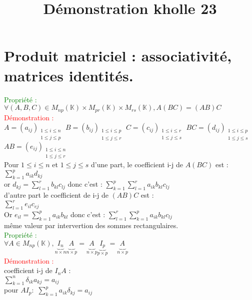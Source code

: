 \documentclass{article}
\begin{document}
\title{Démonstration kholle 23}
\date{}
\maketitle
	\renewcommand{\thesection}{\Roman{section}}
	\setlength{\parindent}{1.5cm}
	\section{ Produit matriciel : associativité, matrices identités.}
	\textcolor{green}{Propriété :}
	$\forall (A,B,C) \in M_{np}(\mathbb K) \times M_{pr}(\mathbb K) \times M_{rs}(\mathbb K), A(BC)=(AB)C$ \\
	\textcolor{red}{Démonstration :} \\
	$A=(a_{ij}){}_{\substack{1\leq i\leq n \\ 1\leq j\leq p}}$
	$B=(b_{ij}){}_{\substack{1\leq i\leq p \\ 1\leq j\leq r}}$
	 $C=(c_{ij}){}_{\substack{1\leq i\leq r \\ 1\leq j\leq s}}$
	 $BC=(d_{ij}){}_{\substack{1\leq i\leq p \\ 1\leq j\leq s}}$
	 $AB=(e_{ij}){}_{\substack{1\leq i\leq n \\ 1\leq j\leq r}}$ \\
	 Pour $1 \leq i \leq n$ et $1 \leq j \leq s$ d'une part, le coefficient i-j de $A(BC)$ est :\\
	  $\sum_{k=1}^p a_{ik}d_{kj}$ \\
	 or $d_{kj}= \sum_{l=1}^r b_{kl} c_{lj}$ donc c'est : $\sum_{k=1}^p \sum_{l=1}^r a_{ik}b_{kl}c_{lj}$ \\
	 d'autre part le coefficient de i-j de $(AB)C$ est : \\
	 $\sum_{l=1}^r e_{il}c_{ej}$ \\
	 Or $e_{il}= \sum_{k=1}^p a_{ik} b_{kl}$ donc c'est : $\sum_{l=1}^r \sum_{k=1}^p a_{ik} b_{kl} c_{lj}$ \\
	 même valeur par intervertion des sommes rectangulaires. \\
	 \textcolor{green}{Propriété :} \\
	 $\forall A \in M_{np}(\mathbb K), \underbrace{I_n}_{n \times n} \underbrace{A_{}}_{n \times p} = \underbrace{A_{}}_{n \times p} \underbrace{I_p}_{p \times p} = \underbrace{A_{}}_{n \times p} $ \\
	 \textcolor{red}{Démonstration :} \\
	 coefficient  i-j de $I_nA$ : \\
	 $\sum_{k=1}^n \delta_{ik}a_{kj}=a_{ij}$ \\
	 pour $A I_p :$ $\sum_{k=1}^p a_{ik} \delta_{kj}=a_{ij}$
\end{document}
